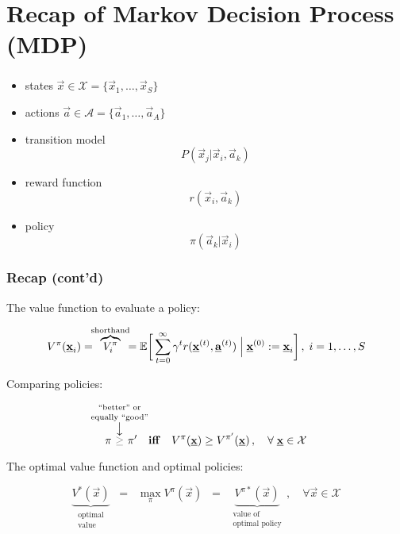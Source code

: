 \section{Recap of Markov Decision Process (MDP)}


\begin{frame}\frametitle{\secname}

\begin{itemize}
\item[] states $\vec x \in \mathcal{X} = \{ \vec x_1, \ldots, \vec x_S\}$
\item[] actions $\vec a \in \mathcal{A} = \{ \vec a_1, \ldots, \vec a_A\}$
\item[] transition model
$$P(\vec x_j | \vec x_i, \vec a_k)$$
\pause
\item[] reward function
$$r(\vec x_i, \vec a_k)$$
\item[] policy
$$
\pi(\vec a_k | \vec x_i)$$
\end{itemize}

\end{frame}

\begin{frame}\frametitle{Recap (cont'd)}

The value function to evaluate a policy:

	\begin{align}
	V^\pi(\underline{\mathbf{x}}_i) = \kern-1ex \overbrace{V^\pi_i}^{\text{shorthand}} \kern-1ex = 
	\mathbb{E} \bigg\lbrack
	\sum_{t=0}^{\infty} \gamma^t r(\underline{\mathbf{x}}^{(t)}, \underline{\mathbf{a}}^{(t)}) \;\Big|\; \underline{\mathbf{x}}^{(0)} := \underline{\mathbf{x}}_i
	\bigg\rbrack\,, \; i=1,\ldots,S
	\end{align}
	
	
Comparing policies:

\begin{equation}
\pi~
\overset{\mathclap{\substack{%
					\text{``better'' or}\\[1mm]\text{equally ``good''}\\ \big\downarrow
					}}}{{\color{gray}\ge}}
~\pi' 
\quad \text{\textbf{iff}} \quad V^{\pi} (\vec x) \ge V^{\pi'} (\vec x)\,,\quad \forall\; \vec x \in \mathcal{X}
\end{equation}

The optimal value function and optimal policies:

\begin{equation}
\underbrace{V^{*}(\vec x)}_{\substack{\text{optimal}\\ \text{value}}} \;\;=\;\; \max_{\pi} V^{\pi} (\vec x) \;\;=\;\; \underbrace{V^{\pi*}(\vec x)}_{\substack{\text{value of}\\ \text{optimal policy}}}\,,\quad \forall \vec x \in \mathcal{X}
\end{equation}

\end{frame}


